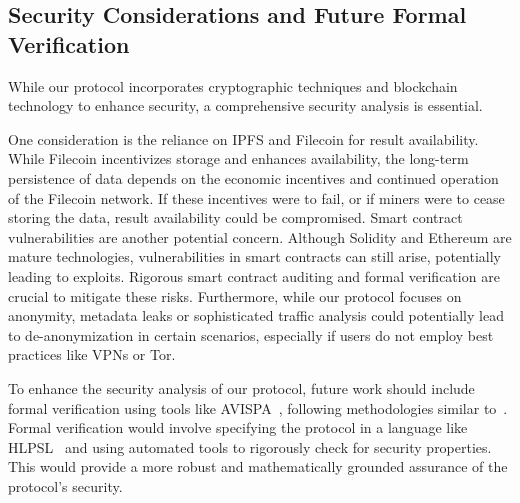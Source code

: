 \documentclass[pdftex,twocolumn,epjc3]{svjour3}
\begin{document}


\subsection{Security Considerations and Future Formal Verification}\label{sec:formal-verification}

While our protocol incorporates cryptographic techniques and blockchain technology to enhance security, a comprehensive security analysis is essential.

\begin{sloppypar}
One consideration is the reliance on IPFS and Filecoin for result availability. While Filecoin incentivizes storage and enhances availability, the long-term persistence of data depends on the economic incentives and continued operation of the Filecoin network.  If these incentives were to fail, or if miners were to cease storing the data, result availability could be compromised.  Smart contract vulnerabilities are another potential concern. Although Solidity and Ethereum are mature technologies, vulnerabilities in smart contracts can still arise, potentially leading to exploits. Rigorous smart contract auditing and formal verification are crucial to mitigate these risks. Furthermore, while our protocol focuses on anonymity, metadata leaks or sophisticated traffic analysis could potentially lead to de-anonymization in certain scenarios, especially if users do not employ best practices like VPNs or Tor.
\end{sloppypar}

\begin{sloppypar}
To enhance the security analysis of our protocol, future work should include formal verification using tools like AVISPA~\cite{armandoAVISPAToolAutomated2005}, following methodologies similar to~\cite{birjoveanuFormalVerificationMultiparty2022}. Formal verification would involve specifying the protocol in a language like HLPSL~\cite{chevalierHighLevelProtocol2004} and using automated tools to rigorously check for security properties. This would provide a more robust and mathematically grounded assurance of the protocol's security.
\end{sloppypar}
\end{document}
